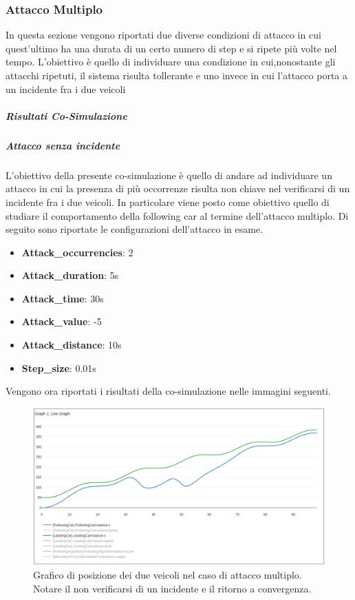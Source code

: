 \subsubsection{Attacco Multiplo}
In questa sezione vengono riportati due diverse condizioni di attacco in cui quest'ultimo ha una durata di un certo numero di step e si ripete più volte nel tempo. L'obiettivo è quello di individuare una condizione in cui,nonostante gli attacchi ripetuti, il sistema risulta tollerante e uno invece in cui l'attacco porta a un incidente fra i due veicoli
\subparagraph{Risultati Co-Simulazione}
\subparagraph{Attacco senza incidente}
L'obiettivo della presente co-simulazione è quello di andare ad individuare un attacco in cui la presenza di più occorrenze risulta non chiave nel verificarsi di un incidente fra i due veicoli. In particolare viene posto come obiettivo quello di studiare il comportamento della following car al termine dell'attacco multiplo. Di seguito sono riportate le configurazioni dell'attacco in esame.
\begin{itemize}
	\item \textbf{Attack\_occurrencies}: 2
	\item \textbf{Attack\_duration}: 5s
	\item \textbf{Attack\_time}: 30s
	\item \textbf{Attack\_value}: -5
	\item \textbf{Attack\_distance}: 10s
	\item \textbf{Step\_size}: 0.01s
\end{itemize}
Vengono ora riportati i risultati della co-simulazione nelle immagini seguenti.

\begin{figure}[H]
	\centering
	\includegraphics[width=\textwidth]{img/MultiAttackAccelPlotXNoCrash.png}
	\caption{Grafico di posizione dei due veicoli nel caso di attacco multiplo. Notare il non verificarsi di un incidente e il ritorno a convergenza.}
\end{figure}

